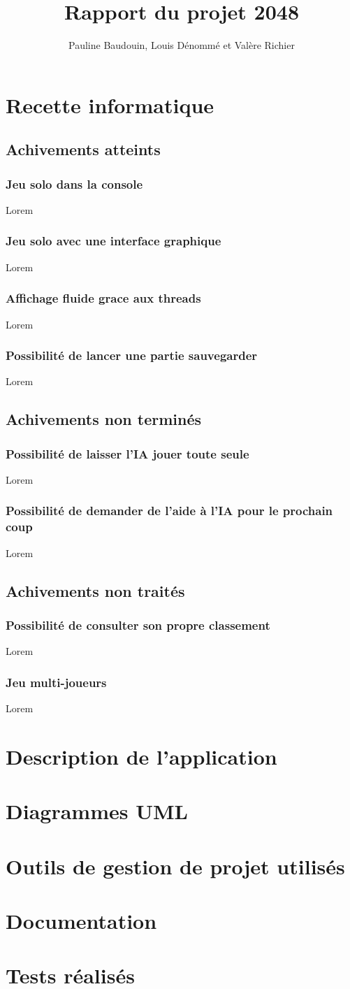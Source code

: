 \documentclass[a4paper,10pt]{report}
\title{Rapport du projet 2048}
\author{Pauline Baudouin, Louis Dénommé et Valère Richier}
\begin{document}
\part{Recette informatique}
  \chapter{Achivements atteints}
    \section{Jeu solo dans la console}
      Lorem
    \section{Jeu solo avec une interface graphique}
      Lorem
    \section{Affichage fluide grace aux threads}
      Lorem
    \section{Possibilité de lancer une partie sauvegarder}
      Lorem
  \chapter{Achivements non terminés}
    \section{Possibilité de laisser l'IA jouer toute seule}
      Lorem
    \section{Possibilité de demander de l'aide à l'IA pour le prochain coup}
      Lorem
  \chapter{Achivements non traités}
    \section{Possibilité de consulter son propre classement}
      Lorem
    \section{Jeu multi-joueurs}
      Lorem
\part{Description de l'application}
\part{Diagrammes UML}
\part{Outils de gestion de projet utilisés}
\part{Documentation}
\part{Tests réalisés}
\end{document}
